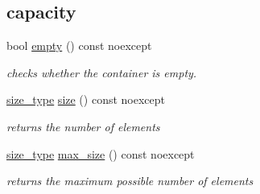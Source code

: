 \subsection*{capacity}
\begin{DoxyCompactItemize}
\item 
bool \hyperlink{classnlohmann_1_1basic__json_a5c99855f3e35ff35558cb46139b785f8}{empty} () const noexcept
\begin{DoxyCompactList}\small\item\em checks whether the container is empty. \end{DoxyCompactList}\item 
\hyperlink{classnlohmann_1_1basic__json_a3ada29bca70b4965f6fd37ec1c8f85f7}{size\+\_\+type} \hyperlink{classnlohmann_1_1basic__json_a33c7c8638bb0b12e6d1b69d8106dd2e0}{size} () const noexcept
\begin{DoxyCompactList}\small\item\em returns the number of elements \end{DoxyCompactList}\item 
\hyperlink{classnlohmann_1_1basic__json_a3ada29bca70b4965f6fd37ec1c8f85f7}{size\+\_\+type} \hyperlink{classnlohmann_1_1basic__json_a1b46c6631e30b8394e89bd1546d69736}{max\+\_\+size} () const noexcept
\begin{DoxyCompactList}\small\item\em returns the maximum possible number of elements \end{DoxyCompactList}\end{DoxyCompactItemize}
